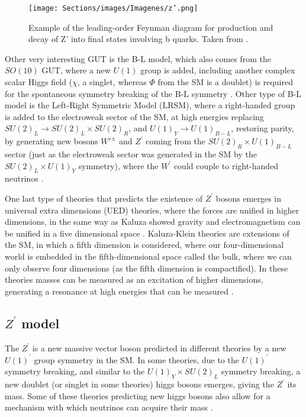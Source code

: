 \begin{figure}[ht]
    \centering
    \texttt{[image: Sections/images/Imagenes/z'.png]}
    \vspace{-1\baselineskip}
    \caption{Example of the leading-order Feynman diagram for production and decay of Z’ into final states involving b quarks. Taken from \cite{Aaboud}.}
    \label{z'}
\end{figure}

Other very interesting GUT is the B-L model, which also comes from the $SO(10)$ GUT, where a new $U(1)$ group is added, including another complex scalar Higgs field ($\chi$, a singlet, whereas $\Phi$ from the SM is a doublet) is required for the spontaneous symmetry breaking of the B-L symmetry \cite{Balasubramaniam}. Other type of B-L model is the Left-Right Symmetric Model (LRSM), where a right-handed group is added to the electroweak sector of the SM, at high energies replacing $SU(2)_L \rightarrow SU(2)_L \times SU(2)_R$, and $U(1)_Y \rightarrow U(1)_{B-L}$, restoring parity, by generating new bosons $W'^{\pm}$ and $Z^{\prime}$ coming from the $SU(2)_R\times U(1)_{B-L}$ sector (just as the electroweak sector was generated in the SM by the $SU(2)_L\times U(1)_Y$ symmetry), where the $W^{\prime}$ could couple to right-handed neutrinos \cite{Hayden}.

One last type of theories that predicts the existence of $Z^{\prime}$ bosons emerges in universal extra dimensions (UED) theories, where the forces are unified in higher dimensions, in the same way as Kaluza showed gravity and electromagnetism can be unified in a five dimensional space \cite{Kaluza}. Kaluza-Klein theories are extensions of the SM, in which a fifth dimension is considered, where our four-dimensional world is embedded in the fifth-dimensional space called the bulk, where we can only observe four dimensions (as the fifth dimension is compactified). In these theories masses can be measured as an excitation of higher dimensions, generating a resonance at high energies that can be measured \cite{Huber}\cite{Riemann}.

\subsection{$Z^{\prime}$ model} \label{ssec:zpmodel}

The $Z^{\prime}$ is a new massive vector boson predicted in different theories by a new $U(1)^{\prime}$ group symmetry in the SM. In some theories, due to the $U(1)^{\prime}$ symmetry breaking, and similar to the $U(1)_Y\times SU(2)_L$ symmetry breaking, a new doublet (or singlet in some theories) higgs bosons emerges, giving the $Z^{\prime}$ its mass. Some of these theories predicting new higgs bosons also allow for a mechanism with which neutrinos can acquire their mass \cite{Leike}.


